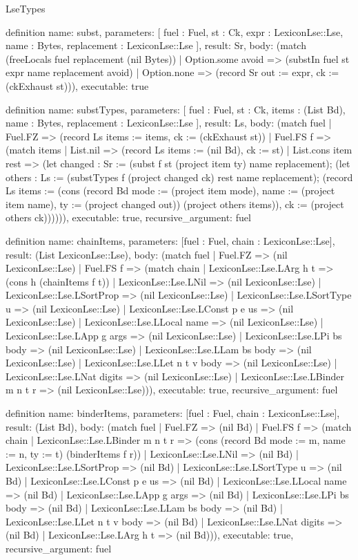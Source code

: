 \begin{lexlean}{LseTypes}
\begin{semanticmodule}
definition{
  name: subst,
  parameters: [
    fuel : Fuel,
    st : Ck,
    expr : LexiconLse::Lse,
    name : Bytes,
    replacement : LexiconLse::Lse
  ],
  result: Sr,
  body: (match (freeLocals fuel replacement (nil Bytes))
    | Option.some avoid => (substIn fuel st expr name replacement avoid)
    | Option.none => (record Sr {out := expr, ck := (ckExhaust st)})),
  executable: true
}

definition{
  name: substTypes,
  parameters: [
    fuel : Fuel,
    st : Ck,
    items : (List Bd),
    name : Bytes,
    replacement : LexiconLse::Lse
  ],
  result: Ls,
  body: (match fuel
    | Fuel.FZ => (record Ls {items := items, ck := (ckExhaust st)})
    | Fuel.FS f => (match items
      | List.nil => (record Ls {items := (nil Bd), ck := st})
      | List.cons item rest => (let changed : Sr := (subst f st (project item ty) name replacement); (let others : Ls := (substTypes f (project changed ck) rest name replacement); (record Ls {items := (cons (record Bd {mode := (project item mode), name := (project item name), ty := (project changed out)}) (project others items)), ck := (project others ck)}))))),
  executable: true,
  recursive_argument: fuel
}

definition{
  name: chainItems,
  parameters: [fuel : Fuel, chain : LexiconLse::Lse],
  result: (List LexiconLse::Lse),
  body: (match fuel
    | Fuel.FZ => (nil LexiconLse::Lse)
    | Fuel.FS f => (match chain
      | LexiconLse::Lse.LArg h t => (cons h (chainItems f t))
      | LexiconLse::Lse.LNil => (nil LexiconLse::Lse)
      | LexiconLse::Lse.LSortProp => (nil LexiconLse::Lse)
      | LexiconLse::Lse.LSortType u => (nil LexiconLse::Lse)
      | LexiconLse::Lse.LConst p e us => (nil LexiconLse::Lse)
      | LexiconLse::Lse.LLocal name => (nil LexiconLse::Lse)
      | LexiconLse::Lse.LApp g args => (nil LexiconLse::Lse)
      | LexiconLse::Lse.LPi bs body => (nil LexiconLse::Lse)
      | LexiconLse::Lse.LLam bs body => (nil LexiconLse::Lse)
      | LexiconLse::Lse.LLet n t v body => (nil LexiconLse::Lse)
      | LexiconLse::Lse.LNat digits => (nil LexiconLse::Lse)
      | LexiconLse::Lse.LBinder m n t r => (nil LexiconLse::Lse))),
  executable: true,
  recursive_argument: fuel
}

definition{
  name: binderItems,
  parameters: [fuel : Fuel, chain : LexiconLse::Lse],
  result: (List Bd),
  body: (match fuel
    | Fuel.FZ => (nil Bd)
    | Fuel.FS f => (match chain
      | LexiconLse::Lse.LBinder m n t r => (cons (record Bd {mode := m, name := n, ty := t}) (binderItems f r))
      | LexiconLse::Lse.LNil => (nil Bd)
      | LexiconLse::Lse.LSortProp => (nil Bd)
      | LexiconLse::Lse.LSortType u => (nil Bd)
      | LexiconLse::Lse.LConst p e us => (nil Bd)
      | LexiconLse::Lse.LLocal name => (nil Bd)
      | LexiconLse::Lse.LApp g args => (nil Bd)
      | LexiconLse::Lse.LPi bs body => (nil Bd)
      | LexiconLse::Lse.LLam bs body => (nil Bd)
      | LexiconLse::Lse.LLet n t v body => (nil Bd)
      | LexiconLse::Lse.LNat digits => (nil Bd)
      | LexiconLse::Lse.LArg h t => (nil Bd))),
  executable: true,
  recursive_argument: fuel
}


\end{semanticmodule}
\end{lexlean}
